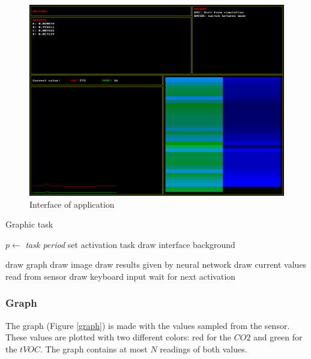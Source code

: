 \documentclass[12pt]{article}
\begin{document}
\begin{figure}[H]
    \centering
    \includegraphics[width=\textwidth]{images/interface.png}
    \caption{Interface of application}
    \label{interface}
\end{figure}

\begin{algorithm}[H]
\caption{Graphic task}
\label{graphic}

\begin{algorithmic}
\State $p\gets$ \textit{task period}
\State set activation task
\State draw interface background

\Loop
\State draw graph
\State draw image
\State draw results given by neural network
\State draw current values read from sensor
\State draw keyboard input
\State wait for next activation
\EndLoop

\end{algorithmic}
\end{algorithm}

\subsubsection*{Graph}
The graph (Figure \ref{graph}) is made with the values sampled from the 
sensor. These values are plotted with two different colors: red for the $CO2$
and green for the $tVOC$. The graph contains at most $N$ readings of both values.
\end{document}
